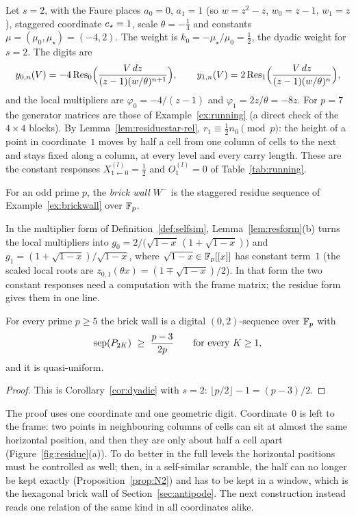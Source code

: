 \begin{example}\label{ex:brickwall}
Let $s=2$, with the Faure places $a_0=0$, $a_1=1$ (so $w=z^2-z$, $w_0=z-1$, $w_1=z$), staggered coordinate $c_{\star}=1$, scale $\theta=-\frac14$ and constants $\mu=(\mu_0,\mu_\star)=(-4,2)$. The weight is $k_0=-\mu_\star/\mu_0=\frac12$, the dyadic weight for $s=2$. The digits are
\[
y_{0,n}(V)=-4\operatorname{Res}_0\Bigl(\frac{V\,dz}{(z-1)(w/\theta)^{n+1}}\Bigr),\qquad y_{1,n}(V)=2\operatorname{Res}_1\Bigl(\frac{V\,dz}{(z-1)(w/\theta)^{n}}\Bigr),
\]
and the local multipliers are $\varphi_0=-4/(z-1)$ and $\varphi_1=2z/\theta=-8z$. For $p=7$ the generator matrices are those of Example~\ref{ex:running} (a direct check of the $4\times4$ blocks). By Lemma~\ref{lem:residuestar-rel}, $r_1\equiv\frac12n_0\pmod p$: the height of a point in coordinate~$1$ moves by half a cell from one column of cells to the next and stays fixed along a column, at every level and every carry length. These are the constant responses $X^{(l)}_{1\leftarrow0}=\frac12$ and $O_1^{(l)}=0$ of Table~\ref{tab:running}.
\end{example}

\begin{definition}\label{def:WF}
For an odd prime $p$, the \emph{brick wall} $W^-$ is the staggered residue sequence of Example~\ref{ex:brickwall} over $\mathbb{F}_p$.
\end{definition}

In the multiplier form of Definition~\ref{def:selfsim}, Lemma~\ref{lem:resform}(b) turns the local multipliers into $g_0=2/\bigl(\sqrt{1-x}\,(1+\sqrt{1-x})\bigr)$ and $g_1=(1+\sqrt{1-x})/\sqrt{1-x}$, where $\sqrt{1-x}\in\mathbb{F}_p[[x]]$ has constant term~$1$ (the scaled local roots are $z_{0,1}(\theta x)=(1\mp\sqrt{1-x})/2$). In that form the two constant responses need a computation with the frame matrix; the residue form gives them in one line.

\begin{theorem}\label{thm:WF}
For every prime $p\ge5$ the brick wall is a digital $(0,2)$-sequence over $\mathbb{F}_p$ with
\[
\operatorname{sep}(P_{2K})\ \ge\ \frac{p-3}{2p}\qquad\text{for every }K\ge1,
\]
and it is quasi-uniform.
\end{theorem}

\begin{proof}
This is Corollary~\ref{cor:dyadic} with $s=2$: $\lfloor p/2\rfloor-1=(p-3)/2$.
\end{proof}

The proof uses one coordinate and one geometric digit. Coordinate~$0$ is left to the frame: two points in neighbouring columns of cells can sit at almost the same horizontal position, and then they are only about half a cell apart (Figure~\ref{fig:residue}(a)). To do better in the full levels the horizontal positions must be controlled as well; then, in a self-similar scramble, the half can no longer be kept exactly (Proposition~\ref{prop:N2}) and has to be kept in a window, which is the hexagonal brick wall of Section~\ref{sec:antipode}. The next construction instead reads one relation of the same kind in all coordinates alike.


